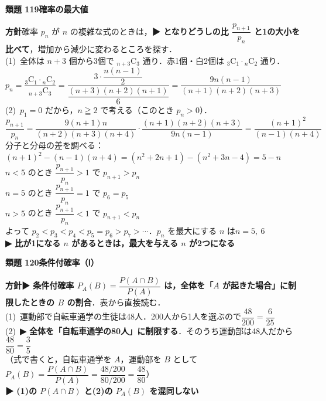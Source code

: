 \documentclass[a4paper,11pt]{ltjsarticle}
\newcommand{\ans}[2]{\Needspace{5\baselineskip}\vspace{6pt}%
  {\sffamily\bfseries 類題 #1\quad #2}\par}
\newcommand{\point}[1]{\textsf{\bfseries ▶ #1}}
\begin{document}
\ans{119}{確率の最大値}
\begin{kai}
\textbf{方針}\quad 確率 $p_n$ が $n$ の複雑な式のときは，\point{となりどうしの比 $\dfrac{p_{n+1}}{p_n}$ と1の大小を比べて}，増加から減少に変わるところを探す．\\[2pt]
(1)\ 全体は $n+3$ 個から3個で ${}_{n+3}\mathrm C_3$ 通り．赤1個・白2個は ${}_3\mathrm C_1\cdot{}_n\mathrm C_2$ 通り．\\[2pt]
\hspace*{1.5em}$p_n=\dfrac{{}_3\mathrm C_1\cdot{}_n\mathrm C_2}{{}_{n+3}\mathrm C_3}=\dfrac{3\cdot\dfrac{n(n-1)}{2}}{\dfrac{(n+3)(n+2)(n+1)}{6}}=\dfrac{9n(n-1)}{(n+1)(n+2)(n+3)}$\\[2pt]
(2)\ $p_1=0$ だから，$n\geqq2$ で考える（このとき $p_n>0$）．\\[2pt]
\hspace*{1.5em}$\dfrac{p_{n+1}}{p_n}=\dfrac{9(n+1)n}{(n+2)(n+3)(n+4)}\cdot\dfrac{(n+1)(n+2)(n+3)}{9n(n-1)}=\dfrac{(n+1)^2}{(n-1)(n+4)}$\\[2pt]
\hspace*{1.5em}分子と分母の差を調べる：$(n+1)^2-(n-1)(n+4)=(n^2+2n+1)-(n^2+3n-4)=5-n$\\
\hspace*{1.5em}$n<5$ のとき $\dfrac{p_{n+1}}{p_n}>1$ で $p_{n+1}>p_n$\\
\hspace*{1.5em}$n=5$ のとき $\dfrac{p_{n+1}}{p_n}=1$ で $p_6=p_5$\\
\hspace*{1.5em}$n>5$ のとき $\dfrac{p_{n+1}}{p_n}<1$ で $p_{n+1}<p_n$\\[2pt]
\hspace*{1.5em}よって $p_2<p_3<p_4<p_5=p_6>p_7>\cdots$．\quad $p_n$ を最大にする $n$ は\quad $n=5,\ 6$\\
\hspace*{1.5em}\point{比が1になる $n$ があるときは，最大を与える $n$ が2つになる}
\end{kai}

\ans{120}{条件付確率（Ⅰ）}
\begin{kai}
\textbf{方針}\quad \point{条件付確率 $P_A(B)=\dfrac{P(A\cap B)}{P(A)}$ は，全体を「$A$ が起きた場合」に制限したときの $B$ の割合}．表から直接読む．\\[2pt]
(1)\ 運動部で自転車通学の生徒は48人．200人から1人を選ぶので\quad $\dfrac{48}{200}=\dfrac{6}{25}$\\[2pt]
(2)\ \point{全体を「自転車通学の80人」に制限する}．そのうち運動部は48人だから\quad $\dfrac{48}{80}=\dfrac35$\\[2pt]
\hspace*{1.5em}（式で書くと，自転車通学を $A$，運動部を $B$ として\quad $P_A(B)=\dfrac{P(A\cap B)}{P(A)}=\dfrac{48/200}{80/200}=\dfrac{48}{80}$）\\
\hspace*{1.5em}\point{(1)の $P(A\cap B)$ と(2)の $P_A(B)$ を混同しない}
\end{kai}
\end{document}
